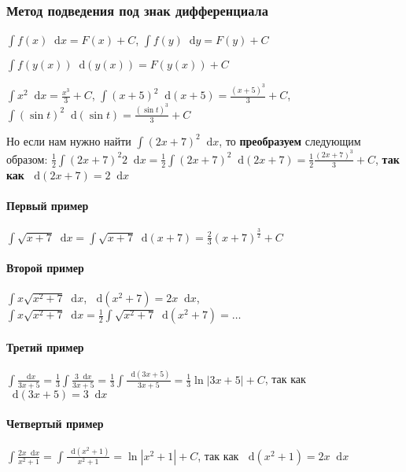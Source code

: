 \documentclass{article}
\newcommand*\diff{\mathop{}\!\mathrm{d}}
\begin{document}
\subsubsection{Метод подведения под знак дифференциала}

$\int f(x) \diff x = F(x) + C$, $\int f(y) \diff y = F(y) + C$

$\int f(y(x)) \diff (y(x)) = F(y(x)) + C$

\hfill

$\int x^2 \diff x = \frac{x^3}{3} + C$, $\int (x + 5)^2 \diff (x + 5) = \frac{(x + 5)^3}{3} + C$, $\int (\sin t)^2 \diff (\sin t) = \frac{(\sin t)^3}{3} + C$

Но если нам нужно найти $\int (2x + 7)^2 \diff x$, то \textbf{преобразуем} следующим образом: $\frac{1}{2} \int (2 x + 7)^2 2 \diff x = \frac{1}{2} \int (2 x + 7)^2 \diff (2 x + 7) = \frac{1}{2} \frac{(2 x + 7)^3}{3} + C$, \textbf{так как} $\diff (2 x + 7) = 2 \diff x$

\paragraph{Первый пример}

$\int \sqrt{x + 7} \diff x = \int \sqrt{x + 7} \diff (x + 7) = \frac{2}{3} (x + 7)^{\frac{3}{2}} + C$

\paragraph{Второй пример}

$\int x \sqrt{x^2 + 7} \diff x$, $\diff (x^2 + 7) = 2 x \diff x$, $\int x \sqrt{x^2 + 7} \diff x = \frac{1}{2} \int \sqrt{x^2 + 7} \diff (x^2 + 7) = \dots$

\paragraph{Третий пример}

$\int \frac{\diff x}{3x + 5} = \frac{1}{3} \int \frac{3 \diff x}{3 x + 5} = \frac{1}{3} \int \frac{\diff (3x + 5)}{3x + 5} = \frac{1}{3} \ln |3 x + 5| + C$, так как $\diff (3 x + 5) = 3 \diff x$

\paragraph{Четвертый пример}

$\int \frac{2 x \diff x}{x^2 + 1} = \int \frac{\diff (x^2 + 1)}{x^2 + 1} = \ln |x^2 + 1| + C$, так как $\diff (x^2 + 1) = 2 x \diff x$
\end{document}
